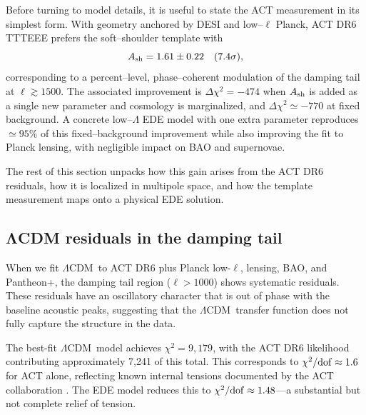 \documentclass[twocolumn,showpacs,preprintnumbers,amsmath,amssymb,prd]{revtex4-2}
\newcommand{\lcdm}{$\Lambda$CDM}
\begin{document}
Before turning to model details, it is useful to state the ACT measurement in
its simplest form. With geometry anchored by DESI and low--$\ell$ Planck, ACT
DR6 TTTEEE prefers the soft--shoulder template with
\begin{equation}
A_{\rm sh} = 1.61 \pm 0.22 \quad (7.4\sigma),
\end{equation}
corresponding to a percent--level, phase--coherent modulation of the damping
tail at $\ell \gtrsim 1500$. The associated improvement is
$\Delta\chi^2 = -474$ when $A_{\rm sh}$ is added as a single new parameter and
cosmology is marginalized, and $\Delta\chi^2 \simeq -770$ at fixed background.
A concrete low--$\Lambda$ EDE model with one extra parameter reproduces
$\simeq 95\%$ of this fixed--background improvement while also improving the fit
to Planck lensing, with negligible impact on BAO and supernovae.

The rest of this section unpacks how this gain arises from the ACT DR6
residuals, how it is localized in multipole space, and how the template
measurement maps onto a physical EDE solution.

\subsection{ΛCDM residuals in the damping tail}

When we fit \lcdm\ to ACT DR6 plus Planck low-$\ell$, lensing, BAO, and Pantheon+, 
the damping tail region ($\ell > 1000$) shows systematic residuals. These residuals 
have an oscillatory character that is out of phase with the baseline acoustic peaks, 
suggesting that the \lcdm\ transfer function does not fully capture the structure 
in the data.

The best-fit \lcdm\ model achieves $\chi^2 = 9{,}179$, with the ACT DR6 
likelihood contributing approximately 7,241 of this total. This corresponds 
to $\chi^2/{\rm dof} \approx 1.6$ for ACT alone, reflecting known internal 
tensions documented by the ACT collaboration \cite{ACT2024}. The EDE model 
reduces this to $\chi^2/{\rm dof} \approx 1.48$---a substantial but not 
complete relief of tension.
\end{document}
